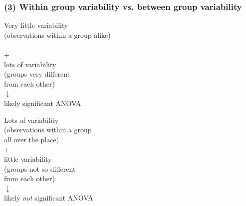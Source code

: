 \documentclass[11pt,containsverbatim,handout]{beamer}
\begin{document}
\begin{frame}
\frametitle{(3) Within group variability vs. between group variability}

{
\begin{center}
Very little variability  \\
{\small (observations within a group alike)} \\
$\:$ \\
+ \\
\pause
lots of variability  \\
{\small (groups very different \\
from each other)} \\
$\downarrow$ \\
\pause
likely significant ANOVA
\end{center}
}
{
\begin{center}
\pause
Lots of variability  \\
{\small (observations within a group \\
all over the place)} \\
+ \\
\pause
little variability  \\
{\small (groups not so different \\
from each other)} \\
$\downarrow$ \\
\pause
likely \emph{not} significant ANOVA
\end{center}
}

\end{frame}

\end{document}
